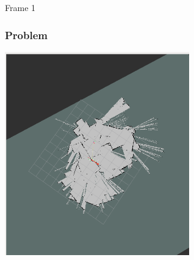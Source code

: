 
\begin{frame}{Frame 1}
\frametitle {Problem}
 \centering
\includegraphics[width=0.6\textwidth]{slides/gfx/map_messy.png}

 
\end{frame}